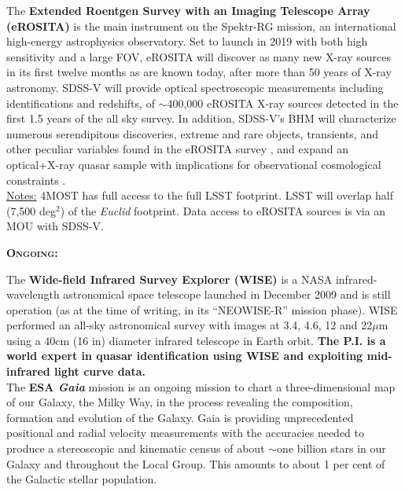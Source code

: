 \begin{framed}
The {\bf Extended Roentgen Survey with an Imaging Telescope Array
(eROSITA)} is the main instrument on the Spektr-RG mission, an
international high-energy astrophysics observatory.  Set to launch in
2019 with both high sensitivity and a large FOV, eROSITA will discover
as many new X-ray sources in its first twelve months as are known
today, after more than 50 years of X-ray astronomy.  SDSS-V will
provide optical spectroscopic measurements including identifications
and redshifts, of $\sim$400,000 eROSITA X-ray sources detected in the
first 1.5 years of the all sky survey.  In addition, SDSS-V's BHM will
characterize numerous serendipitous discoveries, extreme and rare
objects, transients, and other peculiar variables found in the eROSITA
survey \citep{Merloni2012}, and expand an optical+X-ray quasar sample
with implications for observational cosmological constraints
\citep[e.g.][]{Risaliti_Lusso2015}.\\

\underline{Notes:} 4MOST has full access to the full LSST
footprint. LSST will overlap half (7,500 deg$^2$) of the {\it Euclid}
footprint. Data access to eROSITA sources is via an MOU with  
SDSS-V. \\

\hrulefill 

\noindent
\textbf{\textsc{Ongoing:}} 

The {\bf Wide-field Infrared Survey Explorer (WISE)} is a NASA
infrared-wavelength astronomical space telescope launched in December
2009 and is still operation (as at the time of writing, in its
``NEOWISE-R'' mission phase). WISE performed an all-sky astronomical
survey with images at 3.4, 4.6, 12 and 22$\mu$m using a 40cm (16 in)
diameter infrared telescope in Earth orbit.  {\bf The P.I. is a world
expert in quasar identification using WISE \citep[e.g., ][]{Ross2012,
Ross2015, Timlin2016, Timlin2018} and exploiting mid-infrared light
curve data.} \\

The \textbf{ESA {\it Gaia}} mission is an ongoing mission to chart a
three-dimensional map of our Galaxy, the Milky Way, in the process
revealing the composition, formation and evolution of the Galaxy. Gaia
is providing unprecedented positional and radial velocity measurements
with the accuracies needed to produce a stereoscopic and kinematic
census of about $\sim$one billion stars in our Galaxy and throughout
the Local Group. This amounts to about 1 per cent of the Galactic
stellar population.
\end{framed}



